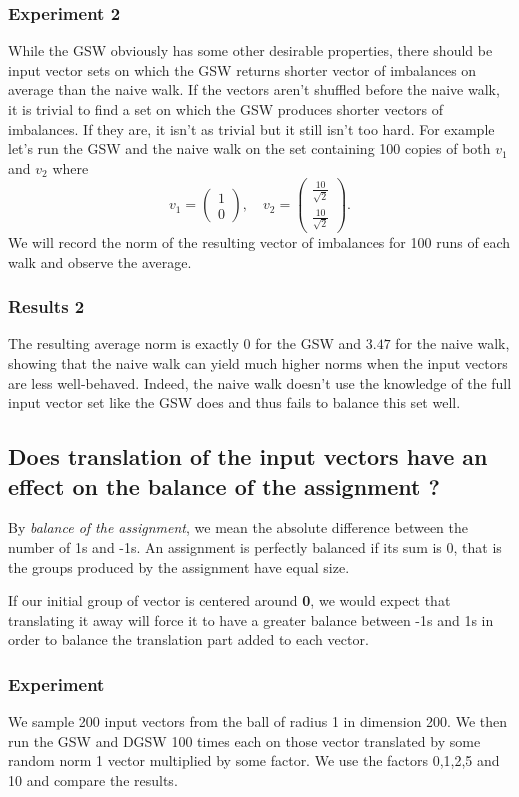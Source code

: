 \documentclass[12pt]{article}
\begin{document}
\subsubsection{Experiment 2}
While the GSW obviously has some other desirable properties, there should be input vector sets on which the GSW returns shorter vector of imbalances on average than the naive walk. If the vectors aren't shuffled before the naive walk, it is trivial to find a set on which the GSW produces shorter vectors of imbalances. If they are, it isn't as trivial but it still isn't too hard. For example let's run the GSW and the naive walk on the set containing 100 copies of both $v_1$ and $v_2$ where $$v_1=\begin{pmatrix}1\\0\end{pmatrix},\quad v_2=\begin{pmatrix}\frac{10}{\sqrt{2}}\\ \frac{10}{\sqrt{2}}\end{pmatrix}.$$
We will record the norm of the resulting vector of imbalances for 100 runs of each walk and observe the average.
\subsubsection{Results 2}
The resulting average norm is exactly $0$ for the GSW and $3.47$ for the naive walk, showing that the naive walk can yield much higher norms when the input vectors are less well-behaved. Indeed, the naive walk doesn't use the knowledge of the full input vector set like the GSW does and thus fails to balance this set well.

\subsection{Does translation of the input vectors have an effect on the balance of the assignment ?}\label{trans_balance}
By \textit{balance of the assignment}, we mean the absolute difference between the number of 1s and -1s. An assignment is perfectly balanced if its sum is 0, that is the groups produced by the assignment have equal size.

If our initial group of vector is centered around \textbf{0}, we would expect that translating it away will force it to have a greater balance between -1s and 1s in order to balance the translation part added to each vector.

\subsubsection{Experiment}
We sample 200 input vectors from the ball of radius 1 in dimension 200. We then run the GSW and DGSW 100 times each on those vector translated by some random norm 1 vector multiplied by some factor. We use the factors 0,1,2,5 and 10 and compare the results.
\end{document}
